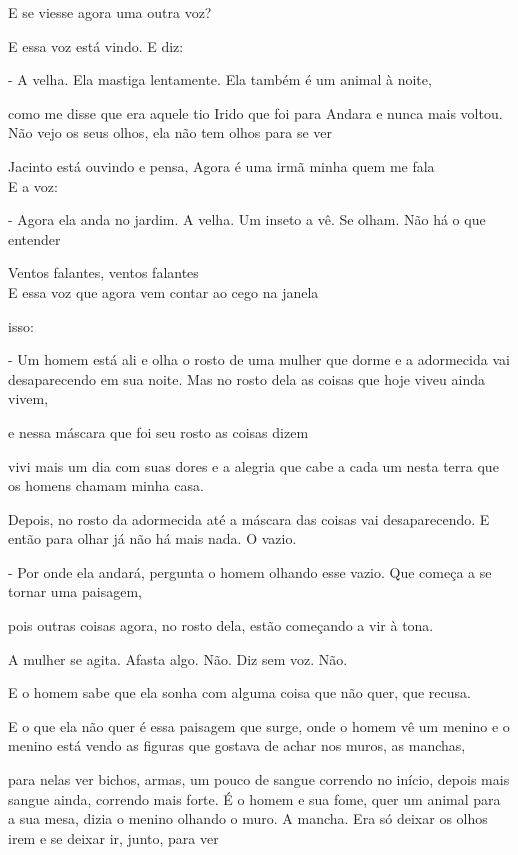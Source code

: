 \pagebreak

E se viesse agora uma outra voz?

E essa voz está vindo. E diz:

- A velha. Ela mastiga lentamente. Ela também é um animal à noite,

como me disse que era aquele tio Irido que foi para Andara e nunca mais
voltou. Não vejo os seus olhos, ela não tem olhos para se ver

Jacinto está ouvindo e pensa, Agora é uma irmã minha quem me fala\\

E a voz:

- Agora ela anda no jardim. A velha. Um inseto a vê. Se olham. Não há o
que entender

\pagebreak

Ventos falantes, ventos falantes\\

E essa voz que agora vem contar ao cego na janela

isso:

- Um homem está ali e olha o rosto de uma mulher que dorme e a
adormecida vai desaparecendo em sua noite. Mas no rosto dela as coisas
que hoje viveu ainda vivem,

e nessa máscara que foi seu rosto as coisas dizem

vivi mais um dia com suas dores e a alegria que cabe a cada um nesta
terra que os homens chamam minha casa.

Depois, no rosto da adormecida até a máscara das coisas vai
desaparecendo. E então para olhar já não há mais nada. O vazio.

- Por onde ela andará, pergunta o homem olhando esse vazio. Que começa a
se tornar uma paisagem,

pois outras coisas agora, no rosto dela, estão começando a vir à tona.

A mulher se agita. Afasta algo. Não. Diz sem voz. Não.

E o homem sabe que ela sonha com alguma coisa que não quer, que recusa.

E o que ela não quer é essa paisagem que surge, onde o homem vê um
menino e o menino está vendo as figuras que gostava de achar nos muros,
as manchas,

para nelas ver bichos, armas, um pouco de sangue correndo no início,
depois mais sangue ainda, correndo mais forte. É o homem e sua fome,
quer um animal para a sua mesa, dizia o menino olhando o muro. A mancha.
Era só deixar os olhos irem e se deixar ir, junto, para ver

